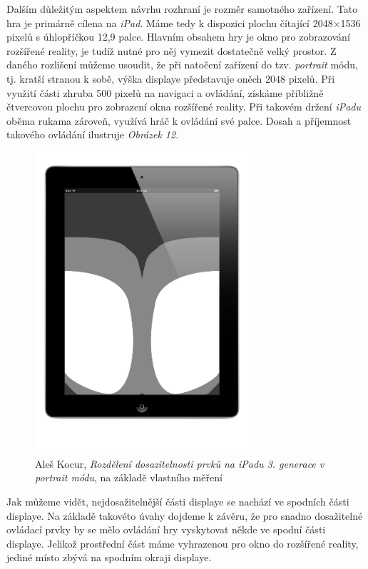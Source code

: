 \documentclass[twoside,12pt]{article}
\begin{document}
Dalším důležitým aspektem návrhu rozhraní je rozměr samotného zařízení. Tato hra je primárně cílena na \textit{iPad}. Máme tedy k dispozici plochu čítající 2048$\times$1536 pixelů s úhlopříčkou 12,9 palce. Hlavním obsahem hry je okno pro zobrazování rozšířené reality, je tudíž nutné pro něj vymezit dostatečně velký prostor. Z daného rozlišení můžeme usoudit, že při natočení zařízení do tzv. \textit{portrait} módu, tj. kratší stranou k sobě, výška displaye představuje oněch 2048 pixelů. Při využití části zhruba 500 pixelů na navigaci a ovládání, získáme přibližně čtvercovou plochu pro zobrazení okna rozšířené reality. Při takovém držení \textit{iPadu} oběma rukama zároveň, využívá hráč k ovládání své palce. Dosah a příjemnost takového ovládání ilustruje \textit{Obrázek 12}.

\begin{figure}[H]
\centering
    \includegraphics[width=300px, center]{images/ipad-toucharea.png}
\captionsetup{justification=centering}
    \caption{Aleš Kocur, \textit{Rozdělení dosazitelnosti prvků na iPadu 3. generace v portrait módu}, na základě vlastního měření}
    \label{class_diagram}
\end{figure}


Jak můžeme vidět, nejdosažitelnější části displaye se nachází ve spodních části displaye. Na základě takovéto úvahy dojdeme k závěru, že pro snadno dosažitelné ovládací prvky by se mělo ovládání hry vyskytovat někde ve spodní části displaye. Jelikož prostřední část máme vyhrazenou pro okno do rozšířené reality, jediné místo zbývá na spodním okraji displaye. 
\end{document}
